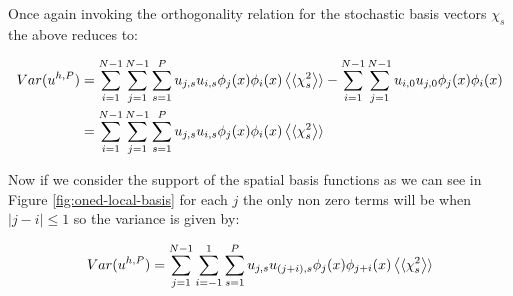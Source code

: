 Once again invoking the orthogonality relation for the stochastic basis vectors
$\chi_s$ the above reduces to:

\begin{align}
  \begin{split}
    Var(u^{h,P}) &= \sum_{i=1}^{N - 1}\sum_{j=1}^{N - 1}\sum_{s=1}^P
      u_{j,s}u_{i,s}\phi_j(x)\phi_i(x)\left\langle\langle\chi_s^2\right\rangle\rangle
            - \sum_{i=1}^{N - 1}\sum_{j=1}^{N-1}u_{i,0}u_{j,0}\phi_j(x)\phi_i(x) \\
      &= \sum_{i=1}^{N-1}\sum_{j=1}^{N-1}\sum_{s=1}^P
            u_{j,s}u_{i,s}\phi_j(x)\phi_i(x)\left\langle\langle\chi_s^2\right\rangle\rangle
  \end{split}
\end{align}

Now if we consider the support of the spatial basis functions as we can see in
Figure \ref{fig:oned-local-basis} for each $j$ the only non zero terms will be
when $|j - i| \leq 1$ so the variance is given by:

\begin{equation}
    Var(u^{h,P})= \sum_{j=1}^{N-1}\sum_{i=-1}^1\sum_{s=1}^P
      u_{j,s}u_{(j+i),s}\phi_j(x)\phi_{j+i}(x)\left\langle\langle\chi_s^2\right\rangle\rangle
\end{equation}
